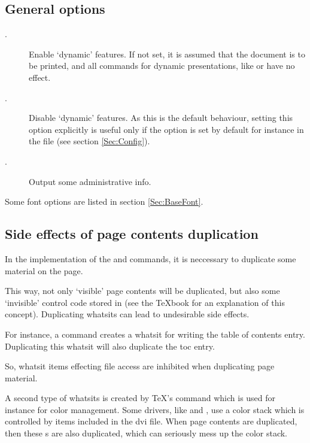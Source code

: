 \documentclass[12pt]{scrartcl}
\let\newslide=\relax
\begin{document}
\newslide

\subsection{General options}\label{Sec:GenOpt}
\begin{description}
\item[.] Enable `dynamic' features. If not set, it is assumed that the document is to be
  printed, and all commands for dynamic presentations, like  or  have no effect.

\item[.] Disable `dynamic' features. As this is the default behaviour,
  setting this option explicitly is useful only if the option  is set by default for instance in the
   file (see section \ref{Sec:Config}).

\item[.] Output some administrative info.
\end{description}
Some font options are listed in section \ref{Sec:BaseFont}.

\newslide

\subsection{Side effects of page contents duplication}\label{Sec:Dupl}
In the implementation of the  and  commands, it is neccessary to duplicate some
material on the page.

This way, not only `visible' page contents will be duplicated, but also some `invisible' control code stored in
 (see the \TeX book for an explanation of this concept). Duplicating whatsits can lead to undesirable
side effects.

For instance, a  command creates a whatsit for writing the table of contents entry. Duplicating this
whatsit will also duplicate the toc entry.

\newslide

So, whatsit items effecting file access are inhibited when duplicating page material.

A second type of whatsits is created by \TeX's  command which is used for instance for color
management. Some drivers, like  and , use a color stack which is controlled by
 items included in the dvi file. When page contents are duplicated, then these s
are also duplicated, which can seriously mess up the color stack.
\end{document}
